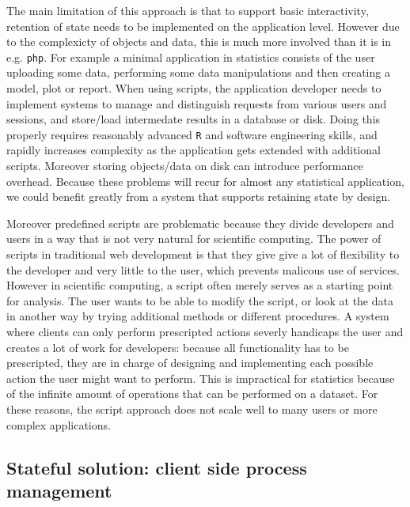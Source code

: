 \documentclass{article}
\newcommand{\R}{\texttt{R}\xspace}
\begin{document}
The main limitation of this approach is that to support basic interactivity, retention of state needs to be implemented on the application level. However due to the complexicty of objects and data, this is much more involved than it is in e.g. \texttt{php}. For example a minimal application in statistics consists of the user uploading some data, performing some data manipulations and then creating a model, plot or report. When using scripts, the application developer needs to implement systems to manage and distinguish requests from various users and sessions, and store/load intermedate results in a database or disk. Doing this properly requires reasonably advanced \R and software engineering skills, and rapidly increases complexity as the application gets extended with additional scripts. Moreover storing objects/data on disk can introduce performance overhead. Because these problems will recur for almost any statistical application, we could benefit greatly from a system that supports retaining state by design.

Moreover predefined scripts are problematic because they divide developers and users in a way that is not very natural for scientific computing. The power of scripts in traditional web development is that they give give a lot of flexibility to the developer and very little to the user, which prevents malicous use of services. However in scientific computing, a script often  merely serves as a starting point for analysis. The user wants to be able to modify the script, or look at the data in another way by trying additional methods or different procedures. A system where clients can only perform prescripted actions severly handicaps the user and creates a lot of work for developers: because all functionality has to be prescripted, they are in charge of designing and implementing each possible action the user might want to perform. This is impractical for statistics because of the infinite amount of operations that can be performed on a dataset. For these reasons, the script approach does not scale well to many users or more complex applications.

\subsection{Stateful solution: client side process management}
\end{document}
